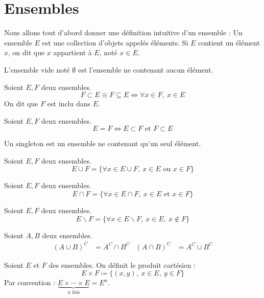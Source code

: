 \chapter{Ensembles}
Nous allons tout d'abord donner une définition intuitive d'un ensemble : Un ensemble $E$ est une collection d'objets appelés éléments. Si $E$ contient un élément $x$, on dit que $x$ appartient à $E$, noté $x \in E$.

\begin{definition}
  L'ensemble vide noté $\emptyset$ est l'ensemble ne contenant aucun élément.
\end{definition}

\begin{definition}[Inclusion]
  Soient $E, F$ deux ensembles.
  $$F \subset E \equiv F \subseteq E \iff \forall x \in F,\ x \in E$$
  On dit que $F$ est inclu dans $E$.
\end{definition}

\begin{definition}
  Soient $E, F$ deux ensembles.
  $$E = F \iff E \subset F \text{ et } F \subset E$$
\end{definition}

\begin{definition}[Singleton]
  Un singleton est un ensemble ne contenant qu'un seul élément.
\end{definition}

\begin{definition}
  Soient $E, F$ deux ensembles.
  \[ E \cup F = \{ \forall x \in E \cup F,\ x \in E \text{ ou } x \in F \} \]
\end{definition}

\begin{definition}
  Soient $E, F$ deux ensembles.
  \[ E \cap F = \{ \forall x \in E \cap F,\ x \in E \text{ et } x \in F \} \]
\end{definition}

\begin{definition}
  Soient $E, F$ deux ensembles.
  \[ E \backslash F = \{ \forall x \in E \backslash F,\ x \in E,\ x \notin F \} \]
\end{definition}

\begin{proposition}
  Soient $A, B$ deux ensembles.
  \begin{align*}
    (A \cup B)^{C} &= A^{C} \cap B^{C} & (A \cap B)^{C} &= A^{C} \cup B^{C}
  \end{align*}
\end{proposition}

\begin{definition}
    Soient $E$ et $F$ des ensembles. On définit le produit cartésien :
    \[ E \times F \coloneqq \{ (x, y),\ x \in E,\ y \in F \} \]
    Par convention : $\underbrace{E \times \cdots \times E}_{n \text{ fois}} = E^n$.
\end{definition}
